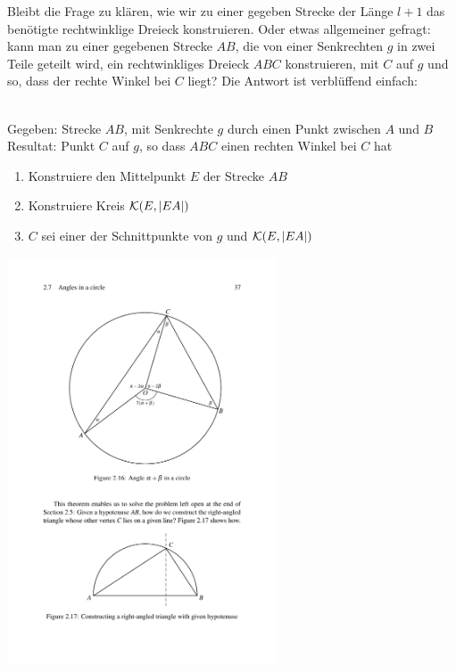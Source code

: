Bleibt die Frage zu klären, wie wir zu einer gegeben Strecke der Länge $l+1$ das benötigte
rechtwinklige Dreieck konstruieren. Oder etwas allgemeiner gefragt: kann man zu einer gegebenen
Strecke $AB$, die von einer Senkrechten $g$ in zwei Teile geteilt wird, ein rechtwinkliges Dreieck
$ABC$ konstruieren, mit $C$ auf $g$ und so, dass der rechte Winkel bei $C$ liegt? Die Antwort ist
verblüffend einfach:

\begin{konst}\ \\
    Gegeben: Strecke $AB$, mit Senkrechte $g$ %
        durch einen Punkt zwischen $A$ und $B$\\
    Resultat: Punkt $C$ auf $g$, so dass $ABC$ einen rechten Winkel bei $C$ hat
    \renewcommand{\labelenumi}{\arabic{enumi}.} %
    \begin{enumerate}
        \item Konstruiere den Mittelpunkt $E$ der Strecke $AB$
        \item Konstruiere Kreis ${\mathcal K}(E,|EA|)$
        \item $C$ sei einer der Schnittpunkte von $g$ und ${\mathcal K}(E,|EA|)$
    \end{enumerate}
\end{konst}

\begin{center}
    \includegraphics[width=8cm]{BILDER/BildKreisUndRechtwinkligesDreieck.pdf}
\end{center}

